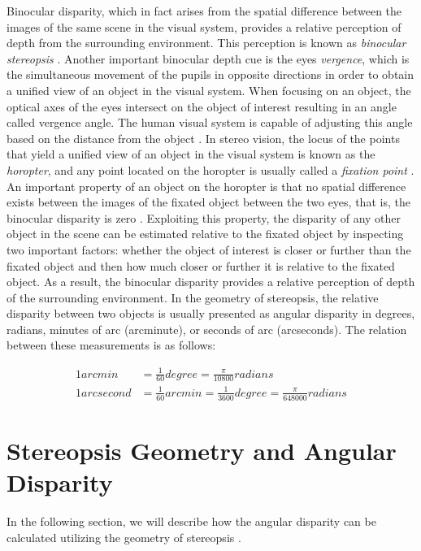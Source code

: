 Binocular disparity, which in fact arises from the spatial difference 
between the images of the same scene in the visual system, provides a relative perception of depth 
from the surrounding environment. This perception is known as {\it binocular stereopsis} \cite{how95}. 
Another important binocular depth cue is the eyes {\it vergence}, which is the simultaneous movement of the pupils in opposite directions in order to obtain a 
unified view of an object in the visual system. 
When focusing on an object, the optical axes of the eyes intersect on the object of interest resulting in an angle called vergence angle. 
The human visual system 
is capable of adjusting this angle based on the distance from the object \cite{how95}.
In stereo vision, the locus of the points that yield a unified view of an object in the visual system is 
known as the {\it horopter}, and any point located on the horopter is usually called a 
{\it fixation point} \cite{binr83,how95}.
An important property of an object on the horopter is that no spatial difference
exists between the images of the fixated object between the two eyes, that is, the binocular disparity is zero \cite{how95}. 
Exploiting this property, the disparity of any other object in the scene can be estimated relative to the fixated object by inspecting two important factors: 
whether the object of interest is closer or further than the fixated object and then how much closer or further it is relative to the fixated object.
As a result, the binocular disparity provides a relative perception of depth of the surrounding environment.
In the geometry of stereopsis, the relative disparity between two objects is usually presented as 
angular disparity in degrees, radians, minutes of arc (arcminute), 
or seconds of arc (arcseconds). The relation between these measurements is as follows:

\begin{align}
1 arcmin &= \frac{1}{60} degree = \frac{\pi}{10800} radians \label{eq:arcmin} \\
1 arcsecond &= \frac{1}{60} arcmin = \frac{1}{3600} degree = \frac{\pi}{648000} radians \label{eq:arcsec}
\end{align}

\section{Stereopsis Geometry and Angular Disparity}

In the following section, we will describe how the angular disparity can be calculated utilizing the geometry of stereopsis \cite{binr83}.

